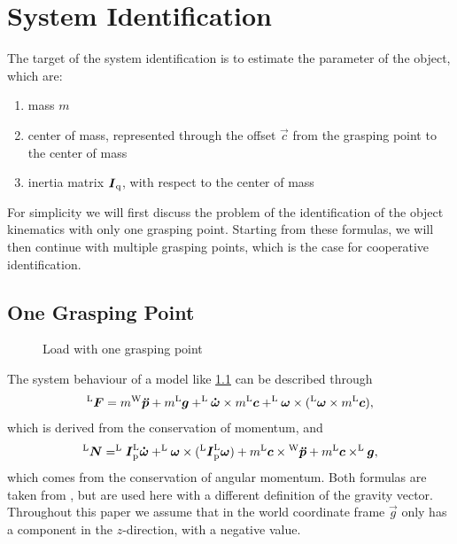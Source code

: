 \chapter{System Identification}
\label{chap:system_identification}

The target of the system identification is to estimate the parameter of the object, which are:
\begin{enumerate}
	\item mass $m$
	\item center of mass, represented through the offset $\vec c$ from the grasping point to the center of mass
	\item inertia matrix $\boldsymbol{I}_{\mathrm{q}}$, with respect to the center of mass
\end{enumerate}

For simplicity we will first discuss the problem of the identification of the object kinematics with only one grasping point. Starting from these formulas, we will then continue with multiple grasping points, which is the case for cooperative identification.

\section{One Grasping Point}
\label{sec:one_grasping_point}

\begin{figure}
	\centering
	
	\caption{Load with one grasping point}
	\label{fig:load_one_grasping_point}
\end{figure}

The system behaviour of a model like \ref{fig:load_one_grasping_point} can be described through 
\begin{equation}
	^{\mathrm{L}}\boldsymbol{F} = m {^{\mathrm{W}}}\boldsymbol{\ddot{p}} + m ^{\mathrm{L}}\boldsymbol{g} + ^{\mathrm{L}}\boldsymbol{\dot{\omega}} \times m ^{\mathrm{L}}\boldsymbol{c} + ^{\mathrm{L}}\boldsymbol{\omega} \times (^{\mathrm{L}}\boldsymbol{\omega} \times m ^{\mathrm{L}}\boldsymbol{c}),
	\label{eq:force}
\end{equation}
which is derived from the conservation of momentum, and
\begin{equation}
	^{\mathrm{L}}\boldsymbol{N} = ^{\mathrm{L}}\boldsymbol{I}_{\mathrm{p}} ^{\mathrm{L}}\boldsymbol{\dot{\omega}} + ^{\mathrm{L}}\boldsymbol{\omega} \times (^{\mathrm{L}}\boldsymbol{I}_{\mathrm{p}} ^{\mathrm{L}}\boldsymbol{\omega}) + m ^{\mathrm{L}}\boldsymbol{c} \times {^{\mathrm{W}}}\boldsymbol{\ddot{p}} + m ^{\mathrm{L}}\boldsymbol{c} \times ^{\mathrm{L}}\boldsymbol{g},
	\label{eq:torque}
\end{equation}
which comes from the conservation of angular momentum. Both formulas are taken from \cite{literaturstelle1}, but are used here with a different definition of the gravity vector. Throughout this paper we assume that in the world coordinate frame $\vec g$ only has a component in the $z$-direction, with a negative value.

